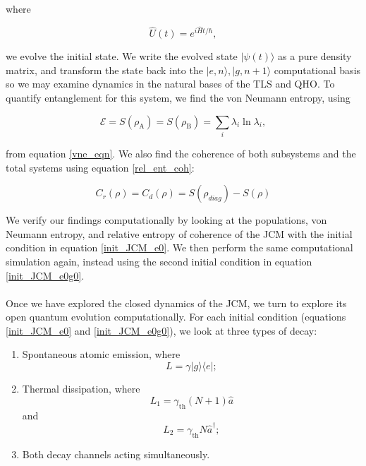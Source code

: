 \documentclass[11pt]{article}
\begin{document}
where 

\begin{equation*}
    \hat{U}(t) = e^{i\hat{H}t/\hbar},
\end{equation*}

we evolve the initial state. We write the evolved state $|\psi(t)\rangle$ as a pure density matrix, and transform the state back into the $|e, n\rangle, |g,n+1\rangle$ computational basis so we may examine dynamics in the natural bases of the TLS and QHO. To quantify entanglement for this system, we find the von Neumann entropy, using

\begin{equation*}
    \mathcal{E} = S(\rho_{\scriptscriptstyle \text{A}}) = S(\rho_{\scriptscriptstyle \text{B}}) = \sum_i \lambda_i\ln\lambda_i,
\end{equation*}

from equation \eqref{vne_eqn}. We also find the coherence of both subsystems and the total systems using equation \eqref{rel_ent_coh}:

\begin{equation*} 
C_r(\rho) = C_d(\rho) = S(\rho_{diag}) - S(\rho)
\end{equation*}

We verify our findings computationally by looking at the populations, von Neumann entropy, and relative entropy of coherence of the JCM with the initial condition in equation \eqref{init_JCM_e0}. We then perform the same computational simulation again, instead using the second initial condition in equation \eqref{init_JCM_e0g0}. \\
\\
Once we have explored the closed dynamics of the JCM, we turn to explore its open quantum evolution computationally. For each initial condition (equations \eqref{init_JCM_e0} and \eqref{init_JCM_e0g0}), we look at three types of decay:

\begin{enumerate}
    \item Spontaneous atomic emission, where 
    \begin{equation*}
        L = \gamma|g\rangle\langle e|;
    \end{equation*}
    \item Thermal dissipation, where
    \begin{equation*}
        L_1 = \gamma_{\scriptscriptstyle \text{th}}(N+1)\hat{a} 
    \end{equation*}
    and 
    \begin{equation*}
        L_2 = \gamma_{\scriptscriptstyle \text{th}}N\hat{a}^\dagger;
    \end{equation*}
    \item Both decay channels acting simultaneously.
\end{enumerate}
\end{document}
